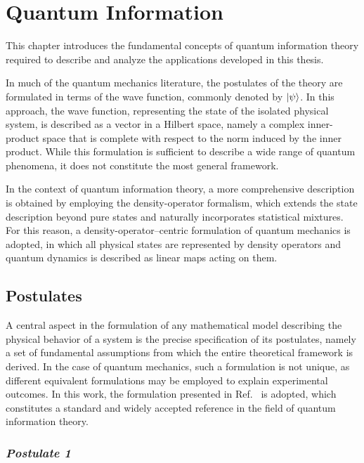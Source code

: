 \chapter{Quantum Information}
\label{sec:quantum_information}

This chapter introduces the fundamental concepts of quantum information theory required to describe and analyze the applications developed in this thesis.

In much of the quantum mechanics literature, the postulates of the theory are formulated in terms of the wave function, commonly denoted by $\ket{\psi}$. In this approach, the wave function, representing the state of the isolated physical system, is described as a vector in a Hilbert space, namely a complex inner-product space that is complete with respect to the norm induced by the inner product. While this formulation is sufficient to describe a wide range of quantum phenomena, it does not constitute the most general framework.

In the context of quantum information theory, a more comprehensive description is obtained by employing the density-operator formalism, which extends the state description beyond pure states and naturally incorporates statistical mixtures. For this reason, a density-operator--centric formulation of quantum mechanics is adopted, in which all physical states are represented by density operators and quantum dynamics is described as linear maps acting on them.


\section{Postulates}
\label{sec:postulates}

A central aspect in the formulation of any mathematical model describing the physical behavior of a system is the precise specification of its postulates, namely a set of fundamental assumptions from which the entire theoretical framework is derived. In the case of quantum mechanics, such a formulation is not unique, as different equivalent formulations may be employed to explain experimental outcomes. In this work, the formulation presented in Ref.~\cite{NielsenChuang2010} is adopted, which constitutes a standard and widely accepted reference in the field of quantum information theory.

\subsection*{\small\textit{Postulate 1}}

